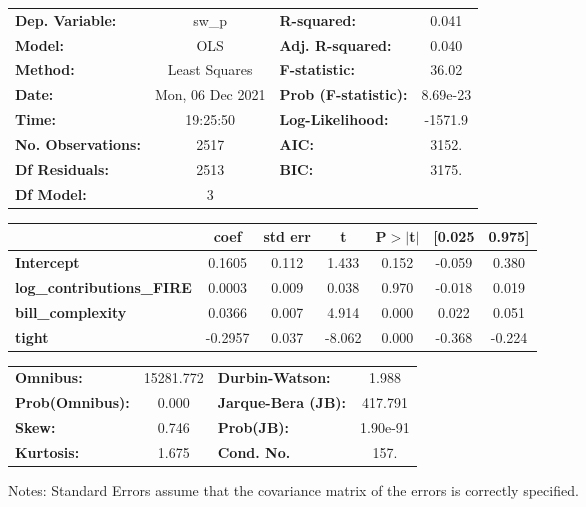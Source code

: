 \begin{center}
\begin{tabular}{lclc}
\toprule
\textbf{Dep. Variable:}           &      sw\_p       & \textbf{  R-squared:         } &     0.041   \\
\textbf{Model:}                   &       OLS        & \textbf{  Adj. R-squared:    } &     0.040   \\
\textbf{Method:}                  &  Least Squares   & \textbf{  F-statistic:       } &     36.02   \\
\textbf{Date:}                    & Mon, 06 Dec 2021 & \textbf{  Prob (F-statistic):} &  8.69e-23   \\
\textbf{Time:}                    &     19:25:50     & \textbf{  Log-Likelihood:    } &   -1571.9   \\
\textbf{No. Observations:}        &        2517      & \textbf{  AIC:               } &     3152.   \\
\textbf{Df Residuals:}            &        2513      & \textbf{  BIC:               } &     3175.   \\
\textbf{Df Model:}                &           3      & \textbf{                     } &             \\
\bottomrule
\end{tabular}
\begin{tabular}{lcccccc}
                                  & \textbf{coef} & \textbf{std err} & \textbf{t} & \textbf{P$> |$t$|$} & \textbf{[0.025} & \textbf{0.975]}  \\
\midrule
\textbf{Intercept}                &       0.1605  &        0.112     &     1.433  &         0.152        &       -0.059    &        0.380     \\
\textbf{log\_contributions\_FIRE} &       0.0003  &        0.009     &     0.038  &         0.970        &       -0.018    &        0.019     \\
\textbf{bill\_complexity}         &       0.0366  &        0.007     &     4.914  &         0.000        &        0.022    &        0.051     \\
\textbf{tight}                    &      -0.2957  &        0.037     &    -8.062  &         0.000        &       -0.368    &       -0.224     \\
\bottomrule
\end{tabular}
\begin{tabular}{lclc}
\textbf{Omnibus:}       & 15281.772 & \textbf{  Durbin-Watson:     } &    1.988  \\
\textbf{Prob(Omnibus):} &    0.000  & \textbf{  Jarque-Bera (JB):  } &  417.791  \\
\textbf{Skew:}          &    0.746  & \textbf{  Prob(JB):          } & 1.90e-91  \\
\textbf{Kurtosis:}      &    1.675  & \textbf{  Cond. No.          } &     157.  \\
\bottomrule
\end{tabular}
\end{center}

Notes: \newline
 [1] Standard Errors assume that the covariance matrix of the errors is correctly specified.